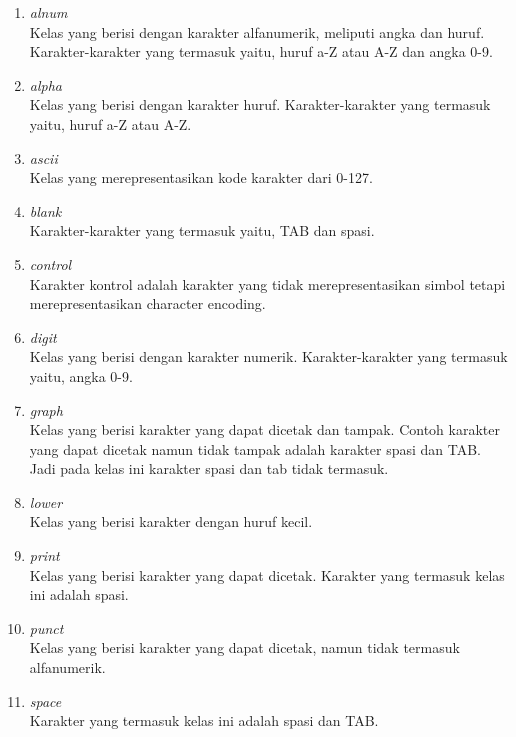\begin{enumerate}
	\item \textit{alnum} \\
	Kelas yang berisi dengan karakter alfanumerik, meliputi angka dan huruf. Karakter-karakter yang termasuk yaitu, huruf a-Z atau A-Z dan angka 0-9.
	
	\item \textit{alpha} \\
	Kelas yang berisi dengan karakter huruf. Karakter-karakter yang termasuk yaitu, huruf a-Z atau A-Z.	
	
	\item \textit{ascii} \\
	Kelas yang merepresentasikan kode karakter dari 0-127.
	
	\item \textit{blank} \\
	Karakter-karakter yang termasuk yaitu, TAB dan spasi.
	
	\item \textit{control} \\
	Karakter kontrol adalah karakter yang tidak merepresentasikan simbol tetapi merepresentasikan character encoding.
	
	\item \textit{digit} \\
	Kelas yang berisi dengan karakter numerik. Karakter-karakter yang termasuk yaitu, angka 0-9.
	
	\item \textit{graph} \\
	Kelas yang berisi karakter yang dapat dicetak dan tampak. Contoh karakter yang dapat dicetak namun tidak tampak adalah karakter spasi dan TAB. Jadi pada kelas ini karakter spasi dan tab tidak termasuk.
	
	\item \textit{lower} \\
	Kelas yang berisi karakter dengan huruf kecil.
	
	\item \textit{print} \\
	Kelas yang berisi karakter yang dapat dicetak. Karakter yang termasuk kelas ini adalah spasi.
	
	\item \textit{punct} \\
	Kelas yang berisi karakter yang dapat dicetak, namun tidak termasuk alfanumerik.
	
	\item \textit{space} \\
	Karakter yang termasuk kelas ini adalah spasi dan TAB.
	

\end{enumerate}
